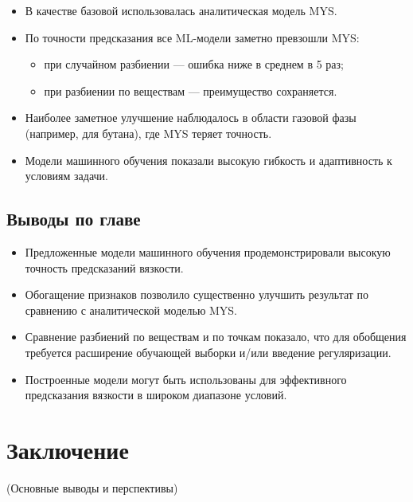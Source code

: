\documentclass[a4paper,12pt]{article}
\begin{document}
    \begin{itemize}
      \item В качестве базовой использовалась аналитическая модель MYS.
      \item По точности предсказания все ML-модели заметно превзошли MYS:
      \begin{itemize}
        \item при случайном разбиении --- ошибка ниже в среднем в 5 раз;
        \item при разбиении по веществам — преимущество сохраняется.
      \end{itemize}
      \item Наиболее заметное улучшение наблюдалось в области газовой фазы (например, для бутана), где MYS теряет точность.
      \item Модели машинного обучения показали высокую гибкость и адаптивность к условиям задачи.
    \end{itemize}

  \subsection{Выводы по главе}
  
    \begin{itemize}
      \item Предложенные модели машинного обучения продемонстрировали высокую точность предсказаний вязкости.
      \item Обогащение признаков позволило существенно улучшить результат по сравнению с аналитической моделью MYS.
      \item Сравнение разбиений по веществам и по точкам показало, что для обобщения требуется расширение обучающей выборки и/или введение регуляризации.
      \item Построенные модели могут быть использованы для эффективного предсказания вязкости в широком диапазоне условий.
    \end{itemize}
\section*{Заключение}
(Основные выводы и перспективы)
\newpage

\end{document}
